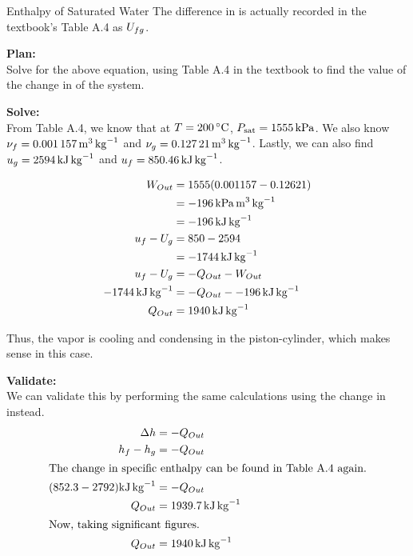 \begin{example}{Enthalpy of Saturated Water}
  The difference in  is actually recorded in the textbook's Table A.4 as $U_{fg}$.

  \textbf{Plan:} \\
  Solve for the above equation, using Table A.4 in the textbook to find the value of the change in  of the system.

  \textbf{Solve:} \\
  From Table A.4, we know that at $\Temp = \SI{200}{\degreeCelsius}$, $P_{\mathrm{sat}} = \SI{1555}{\kilo\pascal}$.
  We also know $\nu_{f} = \SI{0.001157}{\meter\cubed\per\kilo\gram}$ and $\nu_{g} = \SI{0.12721}{\meter\cubed\per\kilo\gram}$.
  Lastly, we can also find $u_{g} = \SI{2594}{\kilo\joule\per\kilo\gram}$ and $u_{f} = \SI{850.46}{\kilo\joule\per\kilo\gram}$.

  \begin{align*}
    W_{Out} &= 1555 (0.001157 - 0.12621) \\
                &= \SI{-196}{\kilo\pascal\meter\cubed\per\kilo\gram} \\
                &= \SI{-196}{\kilo\joule\per\kilo\gram} \\
    u_{f} - U_{g} &= 850 - 2594 \\
                &= \SI{-1744}{\kilo\joule\per\kilo\gram} \\
    u_{f} - U_{g} &= -Q_{Out} - W_{Out} \\
    \SI{-1744}{\kilo\joule\per\kilo\gram} &= -Q_{Out} - \SI{-196}{\kilo\joule\per\kilo\gram} \\
    Q_{Out} &= \SI{1940}{\kilo\joule\per\kilo\gram}
  \end{align*}

  Thus, the vapor is cooling and condensing in the piston-cylinder, which makes sense in this case.

  \textbf{Validate:} \\
  We can validate this by performing the same calculations using the change in  instead.
  \begin{align*}
    \Delta h &= -Q_{Out} \\
    h_{f} - h_{g} &= -Q_{Out} \\
    \intertext{The change in specific enthalpy can be found in Table A.4 again.}
    (852.3 - 2792) \si{\kilo\joule\per\kilo\gram} &= -Q_{Out} \\
    Q_{Out} &= \SI{1939.7}{\kilo\joule\per\kilo\gram} \\
    \shortintertext{Now, taking significant figures.}
    Q_{Out} &= \SI{1940}{\kilo\joule\per\kilo\gram}
  \end{align*}


\end{example}
